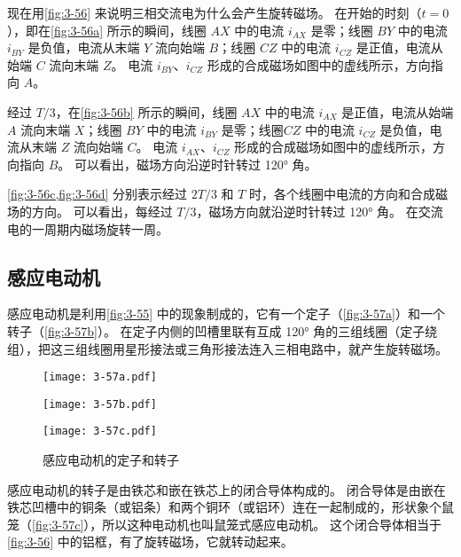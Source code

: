 现在用\cref{fig:3-56} 来说明三相交流电为什么会产生旋转磁场。
在开始的时刻（$t=0$），即在\cref{fig:3-56a} 所示的瞬间，线圈 $AX$ 中的电流 $i_{AX}$ 是零；线圈 $BY$ 中的电流 $i_{BY}$ 是负值，电流从末端 $Y$ 流向始端 $B$；线圈 $CZ$ 中的电流 $i_{CZ}$ 是正值，电流从始端 $C$ 流向末端 $Z$。
电流 $i_{BY}$、$i_{CZ}$ 形成的合成磁场如图中的虚线所示，方向指向 $A$。

经过 $T/3$，在\cref{fig:3-56b} 所示的瞬间，线圈 $AX$ 中的电流 $i_{AX}$ 是正值，电流从始端 $A$ 流向末端 $X$；线圈 $BY$ 中的电流 $i_{BY}$ 是零；线圈$CZ$ 中的电流 $i_{CZ}$ 是负值，电流从末端 $Z$ 流向始端 $C$。
电流 $i_{AX}$、$i_{CZ}$ 形成的合成磁场如图中的虚线所示，方向指向 $B$。
可以看出，磁场方向沿逆时针转过 \ang{120} 角。

\cref{fig:3-56c,fig:3-56d} 分别表示经过 $2T/3$ 和 $T$ 时，各个线圈中电流的方向和合成磁场的方向。
可以看出，每经过 $T/3$，磁场方向就沿逆时针转过 \ang{120} 角。
在交流电的一周期内磁场旋转一周。

\subsection{感应电动机}

感应电动机是利用\cref{fig:3-55} 中的现象制成的，它有一个定子（\cref{fig:3-57a}）和一个转子（\cref{fig:3-57b}）。
在定子内侧的凹槽里联有互成 \ang{120} 角的三组线圈（定子绕组），把这三组线圈用星形接法或三角形接法连入三相电路中，就产生旋转磁场。
\begin{figure}
\begin{minipage}[b]{0.44\linewidth}\centering
  \texttt{[image: 3-57a.pdf]}
  \label{fig:3-57a}
\end{minipage}
\begin{minipage}[b]{0.27\linewidth}\centering
  \texttt{[image: 3-57b.pdf]}
  \label{fig:3-57b}
\end{minipage}
\begin{minipage}[b]{0.25\linewidth}\centering
  \texttt{[image: 3-57c.pdf]}
  \label{fig:3-57c}
\end{minipage}
\caption{感应电动机的定子和转子}\label{fig:3-57}
\end{figure}

感应电动机的转子是由铁芯和嵌在铁芯上的闭合导体构成的。
闭合导体是由嵌在铁芯凹槽中的铜条（或铝条）和两个铜环（或铝环）连在一起制成的，形状象个鼠笼（\cref{fig:3-57c}），所以这种电动机也叫鼠笼式感应电动机。
这个闭合导体相当于\cref{fig:3-56} 中的铝框，有了旋转磁场，它就转动起来。

